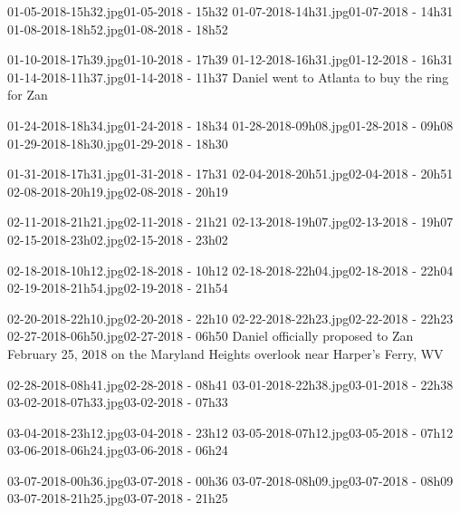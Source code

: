 ﻿\documentclass[letterpaper, 12pt, landscape]{ProgressBook}
\begin{document}
{01-05-2018-15h32.jpg}{01-05-2018 - 15h32}
{01-07-2018-14h31.jpg}{01-07-2018 - 14h31}
{01-08-2018-18h52.jpg}{01-08-2018 - 18h52}

{01-10-2018-17h39.jpg}{01-10-2018 - 17h39}
{01-12-2018-16h31.jpg}{01-12-2018 - 16h31}
{01-14-2018-11h37.jpg}{01-14-2018 - 11h37}
{Daniel went to Atlanta to buy the ring for Zan}

{01-24-2018-18h34.jpg}{01-24-2018 - 18h34}
{01-28-2018-09h08.jpg}{01-28-2018 - 09h08}
{01-29-2018-18h30.jpg}{01-29-2018 - 18h30}

{01-31-2018-17h31.jpg}{01-31-2018 - 17h31}
{02-04-2018-20h51.jpg}{02-04-2018 - 20h51}
{02-08-2018-20h19.jpg}{02-08-2018 - 20h19}

{02-11-2018-21h21.jpg}{02-11-2018 - 21h21}
{02-13-2018-19h07.jpg}{02-13-2018 - 19h07}
{02-15-2018-23h02.jpg}{02-15-2018 - 23h02}

{02-18-2018-10h12.jpg}{02-18-2018 - 10h12}
{02-18-2018-22h04.jpg}{02-18-2018 - 22h04}
{02-19-2018-21h54.jpg}{02-19-2018 - 21h54}

{02-20-2018-22h10.jpg}{02-20-2018 - 22h10}
{02-22-2018-22h23.jpg}{02-22-2018 - 22h23}
{02-27-2018-06h50.jpg}{02-27-2018 - 06h50}
{Daniel officially proposed to Zan February 25, 2018 on the Maryland Heights overlook near Harper's Ferry, WV }

{02-28-2018-08h41.jpg}{02-28-2018 - 08h41}
{03-01-2018-22h38.jpg}{03-01-2018 - 22h38}
{03-02-2018-07h33.jpg}{03-02-2018 - 07h33}

{03-04-2018-23h12.jpg}{03-04-2018 - 23h12}
{03-05-2018-07h12.jpg}{03-05-2018 - 07h12}
{03-06-2018-06h24.jpg}{03-06-2018 - 06h24}

{03-07-2018-00h36.jpg}{03-07-2018 - 00h36}
{03-07-2018-08h09.jpg}{03-07-2018 - 08h09}
{03-07-2018-21h25.jpg}{03-07-2018 - 21h25}
\end{document}

